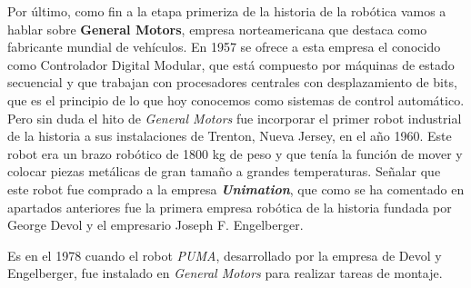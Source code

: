 Por último, como fin a la etapa primeriza de la historia de la robótica vamos a hablar sobre \textbf{General Motors}, empresa norteamericana que destaca como fabricante mundial de vehículos. En 1957 se ofrece a esta empresa el conocido como Controlador Digital Modular, que está compuesto por máquinas de estado secuencial y que trabajan con procesadores centrales con desplazamiento de bits, que es el principio de lo que hoy conocemos como sistemas de control automático.\\

Pero sin duda el hito de \textit{General Motors} fue incorporar el primer robot industrial de la historia a sus instalaciones de Trenton, Nueva Jersey, en el año 1960. Este robot era un brazo robótico de 1800 kg de peso y que tenía la función de mover y colocar piezas metálicas de gran tamaño a grandes temperaturas. Señalar que este robot fue comprado a la empresa \textit{\textbf{Unimation}}, que como se ha comentado en apartados anteriores fue la primera empresa robótica de la historia fundada por  George Devol y el empresario  Joseph F. Engelberger.

Es en el 1978 cuando el robot \textit{PUMA}, desarrollado por la empresa de Devol y Engelberger, fue instalado en \textit{General Motors} para realizar tareas de montaje.
